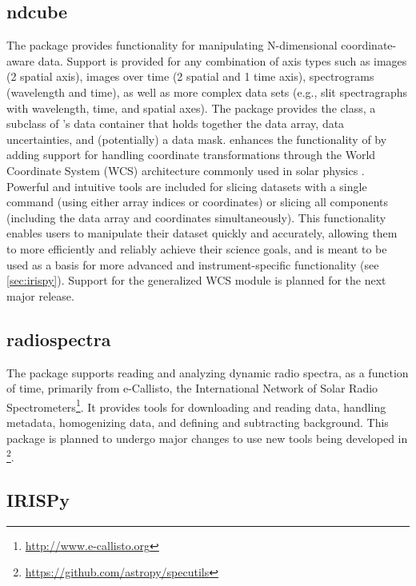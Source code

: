 \subsection{ndcube}
\label{sec:ndcube}

The  package provides functionality for manipulating N-dimensional coordinate-aware data.
Support is provided for any combination of axis types such as images (2 spatial axis), images over time (2 spatial and 1 time axis), spectrograms (wavelength and time), as well as more complex data sets (e.g., slit spectragraphs with wavelength, time, and spatial axes).
The package provides the  class, a subclass of \astropy's  data container that holds together the data array, data uncertainties, and (potentially) a data mask.
 enhances the functionality of  by adding support for handling coordinate transformations through the World Coordinate System (WCS) architecture commonly used in solar physics \citep{2002A&A...395.1061G, 2006A&A...449..791T}.
Powerful and intuitive tools are included for slicing datasets with a single command (using either array indices or coordinates) or slicing all components (including the data array and coordinates simultaneously).
This functionality enables users to manipulate their dataset quickly and accurately, allowing them to more efficiently and reliably achieve their science goals, and is meant to be used as a basis for more advanced and instrument-specific functionality (see \autoref{sec:irispy}).
Support for the generalized WCS module \citep{gwcs2018} is planned for the next major release.

\subsection{radiospectra}

The  package supports reading and analyzing dynamic radio spectra, as a function of time, primarily from e-Callisto, the International Network of Solar Radio Spectrometers\footnote{\url{http://www.e-callisto.org}}.
It provides tools for downloading and reading data, handling metadata, homogenizing data, and defining and subtracting background.
This package is planned to undergo major changes to use new tools being developed in \footnote{\url{https://github.com/astropy/specutils}}.

\subsection{IRISPy}
\label{sec:irispy}

